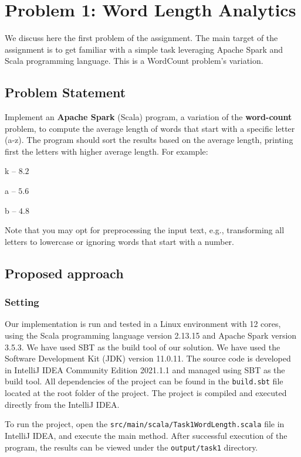 \documentclass[acmlarge]{acmart}
\begin{document}
  \section{Problem 1: Word Length Analytics}
  \label{sec:problem1}
  We discuss here the first problem of the assignment.
  The main target of the assignment is to get familiar with a simple task leveraging Apache Spark and Scala programming language. This is a WordCount problem's variation.

  \subsection{Problem Statement}
  Implement an \textbf{Apache Spark} (Scala) program, a variation of the \textbf{word-count} problem, to compute the average length of words that start with a specific letter (a-z). The program should sort the results based on the average length, printing first the letters with higher average length. For example:
  \begin{description}
    \item k – $8.2$
    \item a – $5.6$
    \item b – $4.8$
  \end{description}
  Note that you may opt for preprocessing the input text, e.g., transforming all letters to lowercase or ignoring words that start with a number.

  \subsection{Proposed approach}
  \subsubsection{Setting}
  Our implementation is run and tested in a Linux environment with 12 cores, using the Scala programming language version 2.13.15 and Apache Spark version 3.5.3. We have used SBT as the build tool of our solution.
  We have used the Software Development Kit (JDK) version 11.0.11.
  The source code is developed in IntelliJ IDEA Community Edition 2021.1.1 and managed using SBT as the build tool. All dependencies of the project can be found in the \texttt{build.sbt} file located at the root folder of the project.
  The project is compiled and executed directly from the IntelliJ IDEA.

  To run the project, open the \texttt{src/main/scala/Task1WordLength.scala} file in IntelliJ IDEA, and execute the main method. After successful execution of the program, the results can be viewed under the \texttt{output/task1} directory.
\end{document}
